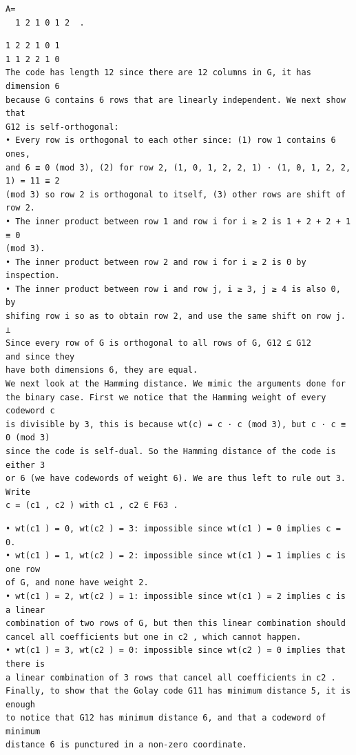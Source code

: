 \documentclass[11pt]{article}
\begin{document}
\begin{solutionbox}
\begin{Verbatim}[fontsize=\small]
A=
  1 2 1 0 1 2  .
\end{Verbatim}
\begin{Verbatim}[fontsize=\small]
1 2 2 1 0 1
1 1 2 2 1 0
The code has length 12 since there are 12 columns in G, it has dimension 6
because G contains 6 rows that are linearly independent. We next show that
G12 is self-orthogonal:
• Every row is orthogonal to each other since: (1) row 1 contains 6 ones,
and 6 ≡ 0 (mod 3), (2) for row 2, (1, 0, 1, 2, 2, 1) · (1, 0, 1, 2, 2, 1) = 11 ≡ 2
(mod 3) so row 2 is orthogonal to itself, (3) other rows are shift of row 2.
• The inner product between row 1 and row i for i ≥ 2 is 1 + 2 + 2 + 1 ≡ 0
(mod 3).
• The inner product between row 2 and row i for i ≥ 2 is 0 by inspection.
• The inner product between row i and row j, i ≥ 3, j ≥ 4 is also 0, by
shifing row i so as to obtain row 2, and use the same shift on row j.
⊥
Since every row of G is orthogonal to all rows of G, G12 ⊆ G12
and since they
have both dimensions 6, they are equal.
We next look at the Hamming distance. We mimic the arguments done for
the binary case. First we notice that the Hamming weight of every codeword c
is divisible by 3, this is because wt(c) = c · c (mod 3), but c · c ≡ 0 (mod 3)
since the code is self-dual. So the Hamming distance of the code is either 3
or 6 (we have codewords of weight 6). We are thus left to rule out 3. Write
c = (c1 , c2 ) with c1 , c2 ∈ F63 .
\end{Verbatim}
\begin{Verbatim}[fontsize=\small]
• wt(c1 ) = 0, wt(c2 ) = 3: impossible since wt(c1 ) = 0 implies c = 0.
• wt(c1 ) = 1, wt(c2 ) = 2: impossible since wt(c1 ) = 1 implies c is one row
of G, and none have weight 2.
• wt(c1 ) = 2, wt(c2 ) = 1: impossible since wt(c1 ) = 2 implies c is a linear
combination of two rows of G, but then this linear combination should
cancel all coefficients but one in c2 , which cannot happen.
• wt(c1 ) = 3, wt(c2 ) = 0: impossible since wt(c2 ) = 0 implies that there is
a linear combination of 3 rows that cancel all coefficients in c2 .
Finally, to show that the Golay code G11 has minimum distance 5, it is enough
to notice that G12 has minimum distance 6, and that a codeword of minimum
distance 6 is punctured in a non-zero coordinate.
\end{Verbatim}
\end{solutionbox}
\end{document}
